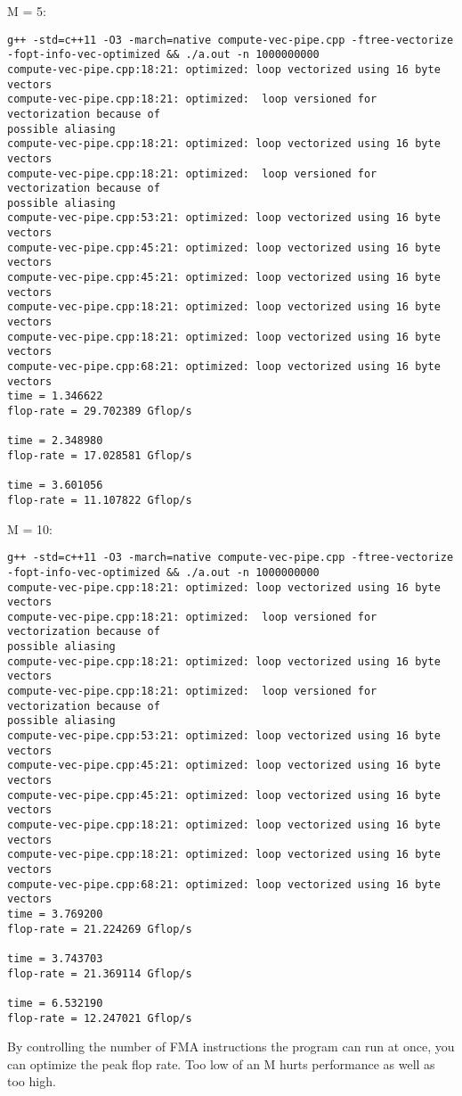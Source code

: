 \documentclass{article}
\begin{document}
\begin{enumerate}
\begin{enumerate}
\begin{verbatim}
        \end{verbatim}

        M = 5:
        \begin{verbatim}
g++ -std=c++11 -O3 -march=native compute-vec-pipe.cpp -ftree-vectorize 
-fopt-info-vec-optimized && ./a.out -n 1000000000
compute-vec-pipe.cpp:18:21: optimized: loop vectorized using 16 byte vectors
compute-vec-pipe.cpp:18:21: optimized:  loop versioned for vectorization because of 
possible aliasing
compute-vec-pipe.cpp:18:21: optimized: loop vectorized using 16 byte vectors
compute-vec-pipe.cpp:18:21: optimized:  loop versioned for vectorization because of 
possible aliasing
compute-vec-pipe.cpp:53:21: optimized: loop vectorized using 16 byte vectors
compute-vec-pipe.cpp:45:21: optimized: loop vectorized using 16 byte vectors
compute-vec-pipe.cpp:45:21: optimized: loop vectorized using 16 byte vectors
compute-vec-pipe.cpp:18:21: optimized: loop vectorized using 16 byte vectors
compute-vec-pipe.cpp:18:21: optimized: loop vectorized using 16 byte vectors
compute-vec-pipe.cpp:68:21: optimized: loop vectorized using 16 byte vectors
time = 1.346622
flop-rate = 29.702389 Gflop/s

time = 2.348980
flop-rate = 17.028581 Gflop/s

time = 3.601056
flop-rate = 11.107822 Gflop/s

        \end{verbatim}

        M = 10:
        \begin{verbatim}
g++ -std=c++11 -O3 -march=native compute-vec-pipe.cpp -ftree-vectorize 
-fopt-info-vec-optimized && ./a.out -n 1000000000
compute-vec-pipe.cpp:18:21: optimized: loop vectorized using 16 byte vectors
compute-vec-pipe.cpp:18:21: optimized:  loop versioned for vectorization because of 
possible aliasing
compute-vec-pipe.cpp:18:21: optimized: loop vectorized using 16 byte vectors
compute-vec-pipe.cpp:18:21: optimized:  loop versioned for vectorization because of 
possible aliasing
compute-vec-pipe.cpp:53:21: optimized: loop vectorized using 16 byte vectors
compute-vec-pipe.cpp:45:21: optimized: loop vectorized using 16 byte vectors
compute-vec-pipe.cpp:45:21: optimized: loop vectorized using 16 byte vectors
compute-vec-pipe.cpp:18:21: optimized: loop vectorized using 16 byte vectors
compute-vec-pipe.cpp:18:21: optimized: loop vectorized using 16 byte vectors
compute-vec-pipe.cpp:68:21: optimized: loop vectorized using 16 byte vectors
time = 3.769200
flop-rate = 21.224269 Gflop/s

time = 3.743703
flop-rate = 21.369114 Gflop/s

time = 6.532190
flop-rate = 12.247021 Gflop/s

        \end{verbatim}

        By controlling the number of FMA instructions the program can run at once, 
you can optimize the peak flop rate.  Too low of an M hurts performance as well as 
too high.
    \end{enumerate}
    
\end{enumerate}
\end{document}
